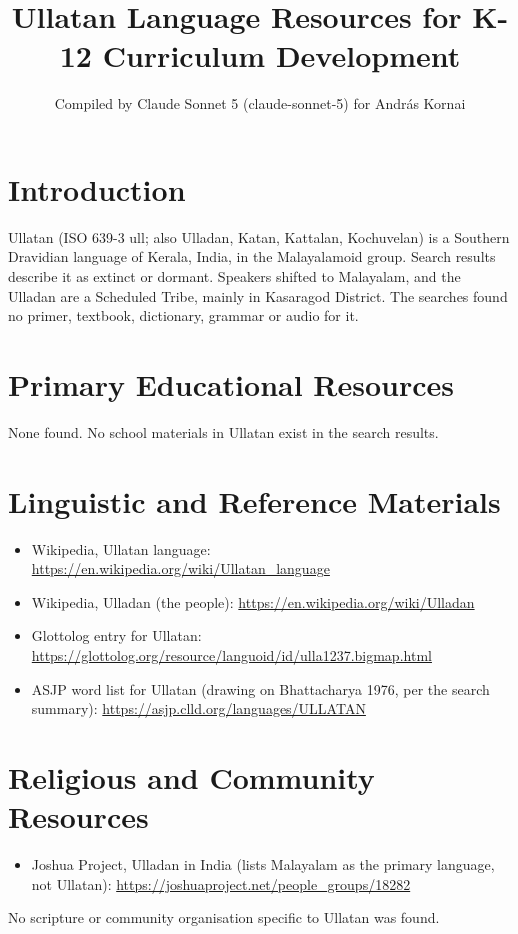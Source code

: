 \documentclass[12pt]{article}
\title{Ullatan Language Resources for K-12 Curriculum Development}
\author{Compiled by Claude Sonnet 5 (claude-sonnet-5) for Andr\'as Kornai}
\date{}
\begin{document}
\maketitle

\section{Introduction}
Ullatan (ISO 639-3 ull; also Ulladan, Katan, Kattalan, Kochuvelan) is a Southern Dravidian language of Kerala, India, in the Malayalamoid group. Search results describe it as extinct or dormant. Speakers shifted to Malayalam, and the Ulladan are a Scheduled Tribe, mainly in Kasaragod District. The searches found no primer, textbook, dictionary, grammar or audio for it.

\section{Primary Educational Resources}
None found. No school materials in Ullatan exist in the search results.

\section{Linguistic and Reference Materials}
\begin{itemize}
\item Wikipedia, Ullatan language: \url{https://en.wikipedia.org/wiki/Ullatan_language}
\item Wikipedia, Ulladan (the people): \url{https://en.wikipedia.org/wiki/Ulladan}
\item Glottolog entry for Ullatan: \url{https://glottolog.org/resource/languoid/id/ulla1237.bigmap.html}
\item ASJP word list for Ullatan (drawing on Bhattacharya 1976, per the search summary): \url{https://asjp.clld.org/languages/ULLATAN}
\end{itemize}

\section{Religious and Community Resources}
\begin{itemize}
\item Joshua Project, Ulladan in India (lists Malayalam as the primary language, not Ullatan): \url{https://joshuaproject.net/people_groups/18282}
\end{itemize}
No scripture or community organisation specific to Ullatan was found.
\end{document}
